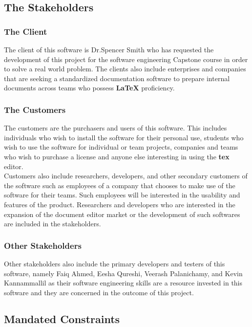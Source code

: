 \documentclass[12pt, titlepage]{article}
\begin{document}
	
	\subsection{The Stakeholders}
	
	\subsubsection{The Client}
	
	The client of this software is Dr.Spencer Smith who has requested the development of this project for the software engineering Capstone course in order to solve a real world problem. The clients also include enterprises and companies that are seeking a standardized documentation software to prepare internal documents across teams who possess \textbf{LaTeX} proficiency.
	
	\subsubsection{The Customers}
	The customers are the purchasers and users of this software. This includes individuals who wish to install the software for their personal use, students who wish to use the software for individual or team projects, companies and teams who wish to purchase a license and anyone else interesting in using the \textbf{tex} editor.\\
	Customers also include researchers, developers, and other secondary customers of the software such as employees of a company that chooses to make use of the software for their teams. Such employees will be interested in the usability and features of the product. Researchers and developers who are interested in the expansion of the document editor market or the development of such softwares are included in the stakeholders.\\
	
	\subsubsection{Other Stakeholders}
	Other stakeholders also include the primary developers and testers of this software, namely Faiq Ahmed, Eesha Qureshi, Veerash Palanichamy, and Kevin Kannammallil as their software engineering skills are a resource invested in this software and they are concerned in the outcome of this project.
	
	\subsection{Mandated Constraints}
	
\end{document}
